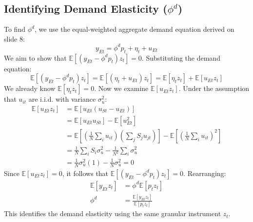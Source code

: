 \documentclass[12pt]{article}
\begin{document}
\subsection{Identifying Demand Elasticity ($\phi^d$)}
To find $\phi^d$, we use the equal-weighted aggregate demand equation derived on slide 8:
\begin{equation}
    y_{Et} = \phi^d p_t + \eta_t + u_{Et} \tag{41}
\end{equation}
We aim to show that $\mathbb{E}[(y_{Et} - \phi^d p_t) z_t] = 0$. Substituting the demand equation:
\begin{equation}
    \mathbb{E}[(y_{Et} - \phi^d p_t) z_t] = \mathbb{E}[(\eta_t + u_{Et}) z_t] = \mathbb{E}[\eta_t z_t] + \mathbb{E}[u_{Et} z_t]
\end{equation}
We already know $\mathbb{E}[\eta_t z_t] = 0$. Now we examine $\mathbb{E}[u_{Et} z_t]$. Under the assumption that $u_{it}$ are i.i.d. with variance $\sigma_u^2$:
\begin{align*}
    \mathbb{E}[u_{Et} z_t] & = \mathbb{E}[u_{Et} (u_{St} - u_{Et})]                                                                                                                                             \\
                           & = \mathbb{E}[u_{Et} u_{St}] - \mathbb{E}[u_{Et}^2]                                                                                                                                 \\
                           & = \mathbb{E} \left[ \left( \frac{1}{N} \sum_{i} u_{it} \right) \left( \sum_{j} S_j u_{jt} \right) \right] - \mathbb{E} \left[ \left( \frac{1}{N} \sum_{i} u_{it} \right)^2 \right] \\
                           & = \frac{1}{N} \sum_{i} S_i \sigma_u^2 - \frac{1}{N^2} \sum_{i} \sigma_u^2                                                                                                          \\
                           & = \frac{1}{N} \sigma_u^2 (1) - \frac{1}{N} \sigma_u^2 = 0
\end{align*}
Since $\mathbb{E}[u_{Et} z_t] = 0$, it follows that $\mathbb{E}[(y_{Et} - \phi^d p_t) z_t] = 0$. Rearranging:
\begin{align*}
    \mathbb{E}[y_{Et} z_t] & = \phi^d \mathbb{E}[p_t z_t]                         \\
    \phi^d                 & = \frac{\mathbb{E}[y_{Et} z_t]}{\mathbb{E}[p_t z_t]}
\end{align*}
This identifies the demand elasticity using the same granular instrument $z_t$.
\end{document}
